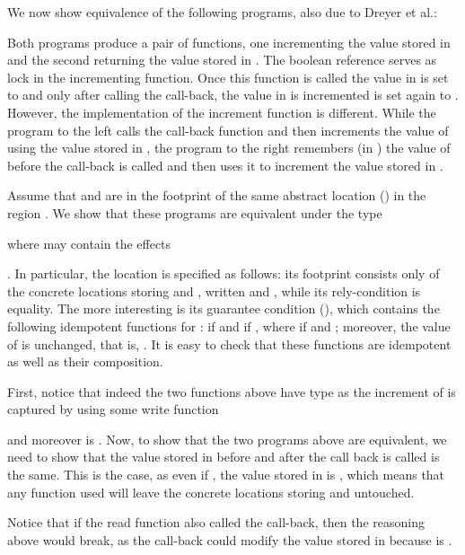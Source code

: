 \documentclass[orivec]{llncs}
\newif\iffull\fullfalse
\renewcommand{\paragraph}[1]{\noindent {\bf #1}}
\begin{document}
\paragraph{Callback with Lock Example}
We now show equivalence of the following programs, also due to Dreyer
et al.\cite{dreyer10icfp}:
\iffull

\else



\noindent
\fi
Both programs produce a pair of functions, one incrementing the
value stored in  and the second returning the value stored in .
The boolean reference  serves as lock in the
incrementing function. 
Once this function is called the value in  is set to
 and only after calling the call-back, the value in
 is incremented is  set again to . However, the
implementation of 
the increment function is different. While the program to the 
left calls the call-back function  and then increments the value of
 using the value stored in , the program to the right remembers (in
) the value of  before the call-back is called and then uses it to
increment the value stored in . 

Assume that  and  are in the footprint of the same abstract location
() in the
region . We show that these programs are equivalent under the type
\iffull

 where  may contain the effects
\else



\noindent
 where  may contain the effects
\fi
. In particular, the location  is
specified as follows: its footprint consists only of the concrete
locations storing  and , written  and , while its
rely-condition is equality. The more interesting is its guarantee condition
(), which contains 
the following idempotent functions  for :
 if  and  if , where  if
 and ; 
moreover, the value of  is unchanged, that is, .
It is easy to check that these functions are idempotent as well as their
composition. 

First, notice that indeed the two functions above have type 
as the increment of  is captured by using some write function

and moreover  is . Now, to show that the two programs above
are equivalent, we need to show that the value stored in  before and
after the call back is called is the same. This is the case, as even if
, the value stored in  is , which means
that any function  used will leave the concrete locations storing 
and  untouched.

Notice that if the read function also called the call-back, then the
reasoning above would break, as the call-back could modify the value
stored in  because  is .
\end{document}
